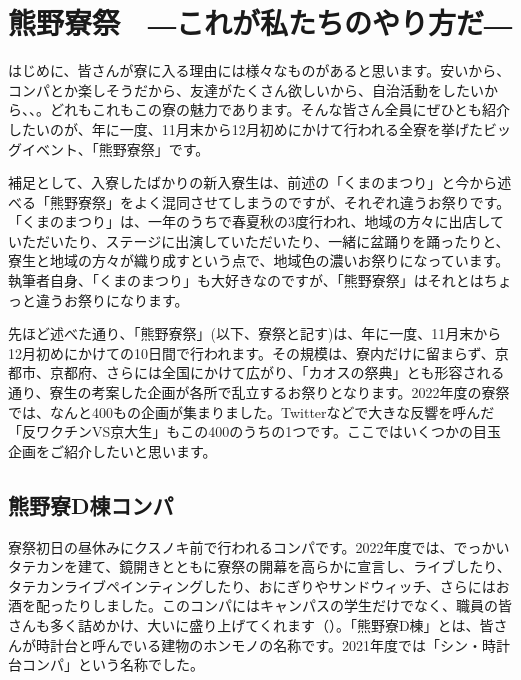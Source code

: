 

\section{熊野寮祭　―これが私たちのやり方だ―}\label{sec:ryosai}

\subsecnomaru

 はじめに、皆さんが寮に入る理由には様々なものがあると思います。安いから、コンパとか楽しそうだから、友達がたくさん欲しいから、自治活動をしたいから、、。どれもこれもこの寮の魅力であります。そんな皆さん全員にぜひとも紹介したいのが、年に一度、11月末から12月初めにかけて行われる全寮を挙げたビッグイベント、「熊野寮祭」です。

 補足として、入寮したばかりの新入寮生は、前述の「くまのまつり」と今から述べる「熊野寮祭」をよく混同させてしまうのですが、それぞれ違うお祭りです。「くまのまつり」は、一年のうちで春夏秋の3度行われ、地域の方々に出店していただいたり、ステージに出演していただいたり、一緒に盆踊りを踊ったりと、寮生と地域の方々が織り成すという点で、地域色の濃いお祭りになっています。執筆者自身、「くまのまつり」も大好きなのですが、「熊野寮祭」はそれとはちょっと違うお祭りになります。

 先ほど述べた通り、「熊野寮祭」(以下、寮祭と記す)は、年に一度、11月末から12月初めにかけての10日間で行われます。その規模は、寮内だけに留まらず、京都市、京都府、さらには全国にかけて広がり、「カオスの祭典」とも形容される通り、寮生の考案した企画が各所で乱立するお祭りとなります。2022年度の寮祭では、なんと400もの企画が集まりました。Twitterなどで大きな反響を呼んだ「反ワクチンVS京大生」もこの400のうちの1つです。ここではいくつかの目玉企画をご紹介したいと思います。



\subsection{熊野寮D棟コンパ}

寮祭初日の昼休みにクスノキ前で行われるコンパです。2022年度では、でっかいタテカンを建て、鏡開きとともに寮祭の開幕を高らかに宣言し、ライブしたり、タテカンライブペインティングしたり、おにぎりやサンドウィッチ、さらにはお酒を配ったりしました。このコンパにはキャンパスの学生だけでなく、職員の皆さんも多く詰めかけ、大いに盛り上げてくれます（）。「熊野寮D棟」とは、皆さんが時計台と呼んでいる建物のホンモノの名称です。2021年度では「シン・時計台コンパ」という名称でした。



